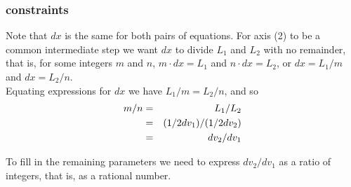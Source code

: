\begin{frame}
\frametitle{constraints}

Note that $dx$ is the same for both pairs of equations.  For axis
(2) to be a common intermediate step we want $dx$ to divide $L_1$
and $L_2$ with no remainder, that is, for some integers $m$ and $n$,
$m \cdot dx = L_1$ and $n \cdot dx = L_2$, or $dx = L_1/m$ and $dx =
L_2/n$. \\
\medskip
Equating expressions for $dx$ we have $L_1 / m = L_2 / n$, and so
\begin{eqnarray*}
  m / n & = & L_1 / L_2 \\
        & = & (1/ 2\/dv_1) / (1/ 2\/dv_2) \\
        & = & dv_2 / dv_1
\end{eqnarray*}

To fill in the remaining parameters we need to express $dv_2 / dv_1$
as a ratio of integers, that is, as a rational number.


\end{frame}
